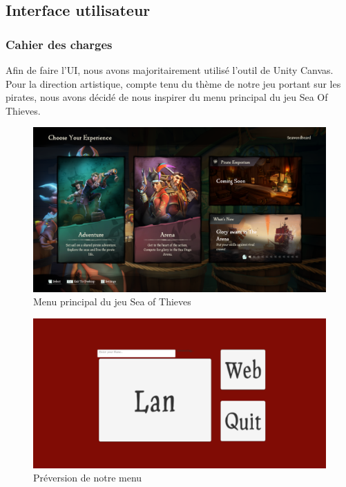 \subsection{Interface utilisateur}
    
    \subsubsection{Cahier des charges}

        Afin de faire l’UI, nous avons majoritairement utilisé l’outil de Unity Canvas. 
        Pour la direction artistique, compte tenu du thème de notre jeu portant sur les pirates, 
        nous avons décidé de nous inspirer du menu principal du jeu Sea Of Thieves. \newline
        

        \begin{figure}[hbt!]
            \centering
            \includegraphics[scale=0.22]{img/sotmenu.png}
            \caption{Menu principal du jeu Sea of Thieves}
        \end{figure}
        \begin{figure}[hbt!]
            \centering
            \includegraphics[scale=0.3]{img/menu.png}
            \caption{Préversion de notre menu}
        \end{figure}
        \FloatBarrier
        

